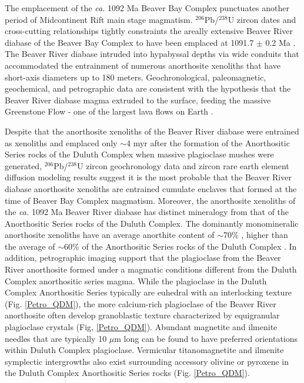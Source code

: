 \documentclass[draft]{agujournal2019}
\begin{document}
The emplacement of the \textit{ca.} 1092 Ma Beaver Bay Complex punctuates another period of Midcontinent Rift main stage magmatism. $^{206}$Pb/$^{238}$U zircon dates and cross-cutting relationships tightly constraints the areally extensive Beaver River diabase of the Beaver Bay Complex to have been emplaced at 1091.7 $\pm$ 0.2 Ma \cite{Zhang2021b}. The Beaver River diabase intruded into hypabyssal depths via wide conduits that accommodated the entrainment of numerous anorthosite xenoliths that have short-axis diameters up to 180 meters. Geochronological, paleomagnetic, geochemical, and petrographic data are consistent with the hypothesis that the Beaver River diabase magma extruded to the surface, feeding the massive Greenstone Flow - one of the largest lava flows on Earth \cite{Doyle2016a, Zhang2021b}.


Despite that the anorthosite xenoliths of the Beaver River diabase were entrained as xenoliths and emplaced only $\sim$4 myr after the formation of the Anorthositic Series rocks of the Duluth Complex when massive plagioclase mushes were generated, $^{206}$Pb/$^{238}$U zircon geochronology data and zircon rare earth element diffusion modeling results suggest it is the most probable that the Beaver River diabase anorthosite xenoliths are entrained cumulate enclaves that formed at the time of Beaver Bay Complex magmatism. Moreover, the anorthosite xenoliths of the \textit{ca.} 1092 Ma Beaver River diabase has distinct mineralogy from that of the Anorthositic Series rocks of the Duluth Complex. The dominantly monomineralic anorthosite xenoliths have an average anorthite content of $\sim$70\% \cite{Morrison1983a, Doyle2016a}, higher than the average of $\sim$60\% of the Anorthositic Series rocks of the Duluth Complex \cite{Miller1990a}. In addition, petrographic imaging support that the plagioclase from the Beaver River anorthosite formed under a magmatic conditions different from the Duluth Complex anorthositic series magma. While the plagioclase in the Duluth Complex Anorthositic Series typically are euhedral with an interlocking texture (Fig. \ref{Petro_QDM}), the more calcium-rich plagioclase of the Beaver River anorthosite often develop granoblastic texture characterized by equigranular plagioclase crystals (Fig, \ref{Petro_QDM}). Abundant magnetite and ilmenite needles that are typically 10 $\mu$m long can be found to have preferred orientations within Duluth Complex plagioclase. Vermicular titanomagnetite and ilmenite symplectic intergrowths also exist surrounding accessory olivine or pyroxene in the Duluth Complex Anorthositic Series rocks (Fig. \ref{Petro_QDM}). 
\end{document}
